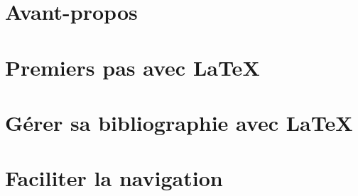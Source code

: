 \ifpapierstandard
\maketitle
\fi

\def\epi{Du \LaTeX sed \TeX}
\def\episource{Proverbe Latin}

\part*{Avant-propos}

\newpage



\mainmatter

\def\epi{Les Sabins \textelp{} commencerent la bataille, qui fut aspre \& dura longuement}
\def\episource{\cite{Sabins}}

\part{Premiers pas avec \LaTeX}








\def\epi{Empoisonnée de dogmes et de mythes, notre opinion, même la moins ennemie des lumières, a perdu jusqu’au goût du contrôle. Le jour où, ayant pris soin d’abord de ne pas la rebuter par un oiseux pédantisme , nous aurons réussi à la persuader de mesurer la valeur d’une connaissance sur son empressement à tendre le cou d’avance à la réfutation, les forces de la raison remporteront une de leurs plus éclatantes victoires. C’est à la préparer que travaillent nos humbles notes, nos petites références tatillonnes que moquent aujourd’hui, sans les comprendre, tant de beaux esprits.}
\def\episource{\cite{Bloch}}
\part{Gérer sa bibliographie avec \LaTeX}\label{bibliographie}








\def\epi{Quand on ne sait pas où on va, il faut y aller\ldots~ et le plus vite possible !}
\def\episource{Devise shadok}
\part{Faciliter la navigation}





